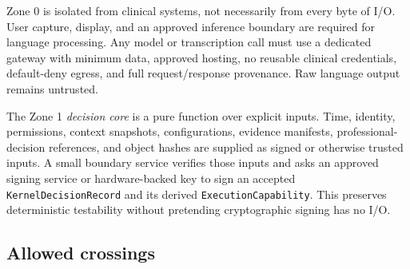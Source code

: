 \documentclass[11pt,letterpaper]{article}
\begin{document}
Zone 0 is isolated from clinical systems, not necessarily from every byte of I/O. User capture, display, and an approved inference boundary are required for language processing. Any model or transcription call must use a dedicated gateway with minimum data, approved hosting, no reusable clinical credentials, default-deny egress, and full request/response provenance. Raw language output remains untrusted.

The Zone 1 \emph{decision core} is a pure function over explicit inputs. Time, identity, permissions, context snapshots, configurations, evidence manifests, professional-decision references, and object hashes are supplied as signed or otherwise trusted inputs. A small boundary service verifies those inputs and asks an approved signing service or hardware-backed key to sign an accepted \texttt{KernelDecisionRecord} and its derived \texttt{ExecutionCapability}. This preserves deterministic testability without pretending cryptographic signing has no I/O.

\subsection{Allowed crossings}
\end{document}
